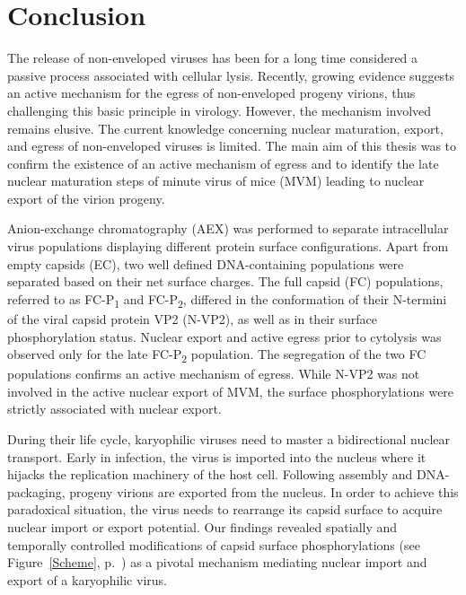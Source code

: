
\chapter*{Conclusion} %

\label{Conclusion} %


\graphicspath{{./Pictures/}}

\newcommand*\circled[1]{\tikz[baseline=(char.base)]{\node[shape=circle,draw,black,inner sep=0.3pt] (char) {#1};}}

The release of non-enveloped viruses has been for a long time considered a passive process associated with cellular lysis. Recently, growing evidence suggests an active mechanism for the egress of non-enveloped progeny virions, thus challenging this basic principle in virology. However, the mechanism involved remains elusive. The current knowledge concerning nuclear maturation, export, and egress of non-enveloped viruses is limited. The main aim of this thesis was to confirm the existence of an active mechanism of egress and to identify the late nuclear maturation steps of minute virus of mice (MVM) leading to nuclear export of the virion progeny. 
    
\par
\medskip
Anion-exchange chromatography (AEX) was performed to separate intracellular virus populations displaying different protein surface configurations. Apart from empty capsids (EC), two well defined DNA-containing populations were separated based on their net surface charges. The full capsid (FC) populations, referred to as FC-P\textsubscript{1} and FC-P\textsubscript{2}, differed in the conformation of their N-termini of the viral capsid protein VP2 (N-VP2), as well as in their surface phosphorylation status. Nuclear export and active egress prior to cytolysis was observed only for the late FC-P\textsubscript{2} population. The segregation of the two FC populations confirms an active mechanism of egress. While N-VP2 was not involved in the active nuclear export of MVM, the surface phosphorylations were strictly associated with nuclear export. 

\par
\medskip
During their life cycle, karyophilic viruses need to master a bidirectional nuclear transport. Early in infection, the virus is imported into the nucleus where it hijacks the replication machinery of the host cell. Following assembly and DNA-packaging, progeny virions are exported from the nucleus. In order to achieve this paradoxical situation, the virus needs to rearrange its capsid surface to acquire nuclear import or export potential. Our findings revealed spatially and temporally controlled modifications of capsid surface phosphorylations (see Figure~\ref{Scheme}, p.~\pageref{Scheme}) as a pivotal mechanism mediating nuclear import and export of a karyophilic virus. 






